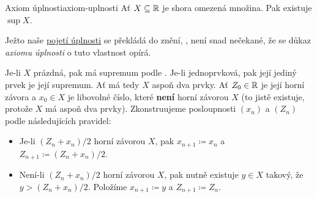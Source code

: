 \begin{proposition}{Axiom úplnosti}{axiom-uplnosti}
 Ať $X \subseteq \mathbb{R}$ je shora omezená množina. Pak existuje $\sup X$.
\end{proposition}
\begin{propproof}
 Ježto naše \hyperref[cor:r-jsou-uplna]{pojetí úplnosti} se překládá do znění,
 , není snad nečekané, že se důkaz
 \emph{axiomu úplnosti} o tuto vlastnost opírá.

 Je-li $X$ prázdná, pak má supremum podle
 . Je-li jednoprvková, pak její
 jediný prvek je její supremum. Ať má tedy $X$ aspoň dva prvky. Ať $Z_0 \in \mathbb{R}$
 je její horní závora a $x_0 \in X$ je libovolné číslo, které \textbf{není}
 horní závorou $X$ (to jistě existuje, protože $X$ má aspoň dva prvky).
 Zkonstruujeme posloupnosti $(x_n)$ a $(Z_n)$ podle následujících pravidel:
 \begin{itemize}
  \item Je-li $(Z_n + x_n) / 2$ horní závorou $X$, pak $x_{n+1} \coloneqq x_n$ a
  $Z_{n+1} \coloneqq (Z_n + x_n) / 2$.
  \item Není-li $(Z_n + x_n) / 2$ horní závorou $X$, pak nutně existuje $y \in
  X$ takový, že $y > (Z_n + x_n) / 2$. Položíme $x_{n+1} \coloneqq y$ a
  $Z_{n+1} \coloneqq Z_n$.
 \end{itemize}

\end{propproof}
